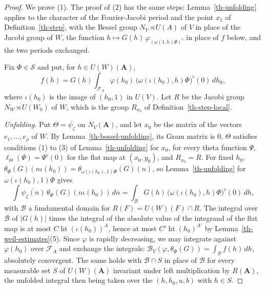 \begin{proof}
We prove (1). The proof of (2) has the same steps: Lemma~\ref{th-unfolding}
applies to the character of the Fourier-Jacobi period and the point $x_1$ of
Definition~\ref{th-step}, with the Bessel group $N_V\rtimes U(A)$ of $V$ in
place of the Jacobi group of $W$, the function
$h\mapsto G(h)\,\varphi_{(\omega(1,h)\Phi)^\flat}$ in place of $f$ below, and the
two periods exchanged.

Fix $\Phi\in\mathcal S$ and put, for $h\in U(W)(\mathbf A)$,
\[
f(h)=G(h)\int_{\mathcal F_A}\varphi(h_0)\,\bigl(\omega(\iota(h_0),h)\Phi\bigr)^\flat(0)\,dh_0,
\]
where $\iota(h_0)$ is the image of $(h_0,1)$ in $U(V)$. Let $R$ be the Jacobi
group $N_W\rtimes U(W_0)$ of $W$, which is the group $R_{x_0}$ of
Definition~\ref{th-step-local}.

\emph{Unfolding.} Put $\Theta=\overline{\psi_\zeta}$ on $N_V(\mathbf A)$, and
let $x_0$ be the matrix of the vectors $e_1,\ldots,e_\rho$ of $W$. By
Lemma~\ref{th-bessel-unfolding}, its Gram matrix is $0$, $\Theta$ satisfies
conditions (1) to (3) of Lemma~\ref{th-unfolding} for $x_0$, for every theta
function $\Psi$, $\ell_\Theta(\Psi)=\Psi^\flat(0)$ for the flat map at
$(x_0,y_0)$, and $R_{x_0}=R$.
For fixed $h_0$, $\theta_\Phi(G)(n\iota(h_0))=\theta_{\omega(\iota(h_0),1)\Phi}(G)(n)$,
so Lemma~\ref{th-unfolding} for $\omega(\iota(h_0),1)\Phi$ gives
\[
\int\overline{\psi_\zeta(n)}\,\theta_\Phi(G)(n\iota(h_0))\,dn
=\int_{\mathcal B}G(h)\,\bigl(\omega(\iota(h_0),h)\Phi\bigr)^\flat(0)\,dh ,
\]
with $\mathcal B$ a fundamental domain for $R(F)=U(W)(F)\cap R$. The integral
over $\mathcal B$ of $|G(h)|$ times the integral of the absolute value of the
integrand of the flat map is at most $C\operatorname{ht}(\iota(h_0))^A$,
hence at most $C'\operatorname{ht}(h_0)^{A'}$ by
Lemma~\ref{th-weil-estimates}(5). Since $\varphi$ is rapidly decreasing, we may
integrate against $\varphi(h_0)$ over $\mathcal F_A$ and exchange the integrals:
$\mathcal B_V(\varphi,\theta_\Phi(G))=\int_{\mathcal B}f(h)\,dh$, absolutely
convergent. The same holds with $\mathcal B\cap S$ in place of $\mathcal B$ for
every measurable set $S$ of $U(W)(\mathbf A)$ invariant under left
multiplication by $R(\mathbf A)$, the unfolded integral then being taken over
the $(h,h_0,u,b)$ with $h\in S$.


\end{proof}
